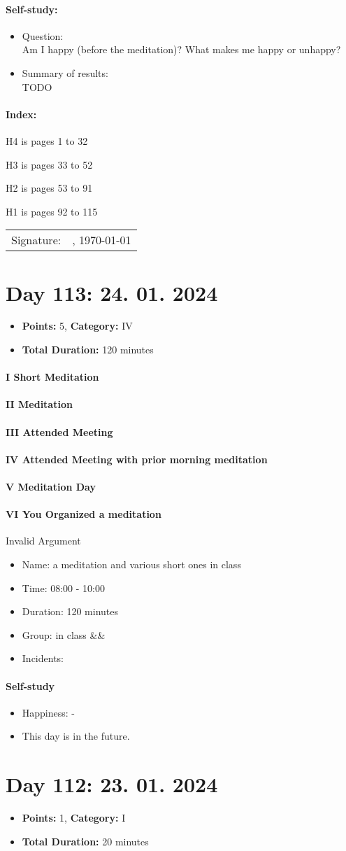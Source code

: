 \documentclass[11pt,a4paper]{article}
\newcommand*\sepstars{%
  \begin{center}
    $\star\star\star$
  \end{center}
  \newpage
}
\newcommand{\daySummary}[3]{
    \begin{itemize}[label={}]
        \item \textbf{Points:} #1, \textbf{Category:} #2
        \item \textbf{Total Duration:} #3 minutes
    \end{itemize}
    \medskip
}
\newcommand{\meditationEntry}[6]{
    \ifcase#1
        \or \paragraph{I Short Meditation}%
        \or \paragraph{II Meditation}%
        \or \paragraph{III Attended Meeting}%
        \or \paragraph{IV Attended Meeting with prior morning meditation}%
        \or \paragraph{V Meditation Day}%
        \or \paragraph{VI You Organized a meditation}%
        \else Invalid Argument%
    \fi
    \begin{itemize}[label={}]
        \item Name: #2
        \item Time: #3
        \item Duration: #4 minutes
        \item Group: #5
        \ifx&#6&%
        \else
            \item Incidents: #6
        \fi
    \end{itemize}
    \smallskip
}
\newcommand{\selfStudy}[3]{
\paragraph{Self-study}
    \begin{itemize}[label={}]
        \item Happiness: #1
        \item #2
    \end{itemize}
    \medskip
}
\begin{document}

\paragraph{Self-study:}
\begin{itemize}
	\item Question:\\
	Am I happy (before the meditation)? What makes me happy or unhappy?
    \item Summary of results:\\
    TODO
\end{itemize}

\paragraph{Index:}

H4 is pages 1 to 32

H3 is pages 33 to 52

H2 is pages 53 to 91

H1 is pages 92 to 115


\vspace*{\fill}

\begin{tabular}{@{}p{.5in}p{4in}@{}}
    Signature: & \hrulefill , \today{} \\
\end{tabular}

\newpage

\section*{Day 113: 24. 01. 2024}
\daySummary{5}{IV}{120}

\meditationEntry{4}{a meditation and various short ones in class}{08:00 - 10:00}{120}{in class}{}
\selfStudy{-}{This day is in the future.}

\sepstars %

\section*{Day 112: 23. 01. 2024}
\daySummary{1}{I}{20}
\end{document}
